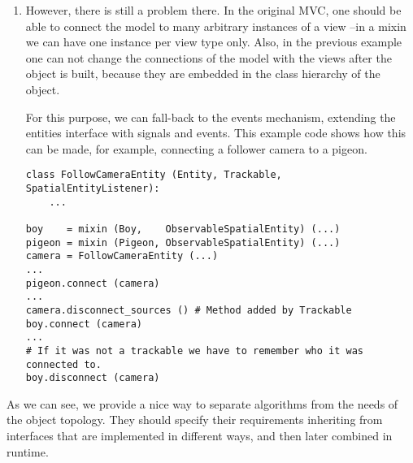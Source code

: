 \documentclass[a4paper,10pt]{article}
\begin{document}
\begin{enumerate}
  But, as the previous code shows, one can build the desired class on
  runtime mixing the needed entity components. For this, we provide
  the utility function \texttt{mixin} that creates a new class from a
  set of bases. For example, this code could be valid\footnote{We do
    not implement networked game, so some of the classes described are
    ficticious.}:

{\footnotesize
\begin{verbatim}
if game_is_local:
    pigeon = mixin (BoidEntity, DynamicPhysicalEntity, ActorEntity) (...)
elif game_is_client:
    pigeon = mixin (ActorEntity, RemotePhysicalEntity) (...)
elif game_is_server:
    pigeon = mixin (BoidEntity, DynamicPhysicalEntity, ServerPhysicalEntity) (...)
pigeon.set_position (100, 100, 100)
\end{verbatim}
}

In that way, the \emph{call-next-method} mechanism would make sure
that when a manipulation method is called on this model+view mixin
object it propagates correctly through all the hierarchy notifying the
views.

\item However, there is still a problem there. In the original MVC,
  one should be able to connect the model to many arbitrary instances of
  a view --in a mixin we can have one instance per view type only. Also, in the previous example one can not change the
  connections of the model with the views after the object is built,
  because they are embedded in the class hierarchy of the object.

  For this purpose, we can fall-back to the events mechanism,
  extending the entities interface with signals and events. This
  example code shows how this can be made, for example, connecting a
  follower camera to a pigeon.

{\footnotesize
\begin{verbatim}
class FollowCameraEntity (Entity, Trackable, SpatialEntityListener):
    ...

boy    = mixin (Boy,    ObservableSpatialEntity) (...)
pigeon = mixin (Pigeon, ObservableSpatialEntity) (...)
camera = FollowCameraEntity (...)
...
pigeon.connect (camera)
...
camera.disconnect_sources () # Method added by Trackable
boy.connect (camera)
...
# If it was not a trackable we have to remember who it was connected to.
boy.disconnect (camera) 
\end{verbatim}
}
\end{enumerate}

As we can see, we provide a nice way to separate algorithms from the
needs of the object topology. They should specify their requirements
inheriting from interfaces that are implemented in different ways, and
then later combined in runtime.
\end{document}
